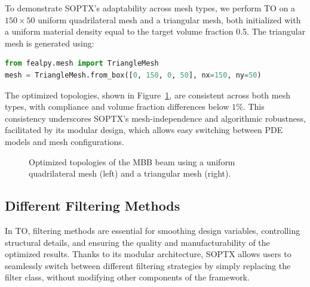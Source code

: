 \documentclass[mathpazo]{cicp}
\begin{document}
To demonstrate SOPTX's adaptability across mesh types, we perform TO on a $150 \times 50$ uniform quadrilateral mesh and a triangular mesh, both initialized with a uniform material density equal to the target volume fraction 0.5. The triangular mesh is generated using:
\begin{lstlisting}[language=Python]
from fealpy.mesh import TriangleMesh
mesh = TriangleMesh.from_box([0, 150, 0, 50], nx=150, ny=50)
\end{lstlisting}

The optimized topologies, shown in Figure~\ref{fig:mbb_2d_all}, are consistent across both mesh types, with compliance and volume fraction differences below $1\%$. This consistency underscores SOPTX's mesh-independence and algorithmic robustness, facilitated by its modular design, which allows easy switching between PDE models and mesh configurations.
\begin{figure}[htb]
	\centering
	\caption{Optimized topologies of the MBB beam using a uniform quadrilateral mesh (left) and a triangular mesh (right).}
	\label{fig:mbb_2d_all}
\end{figure}

\subsection{Different Filtering Methods}
In TO, filtering methods are essential for smoothing design variables, controlling structural details, and ensuring the quality and manufacturability of the optimized results. Thanks to its modular architecture, SOPTX allows users to seamlessly switch between different filtering strategies by simply replacing the filter class, without modifying other components of the framework.
\end{document}
